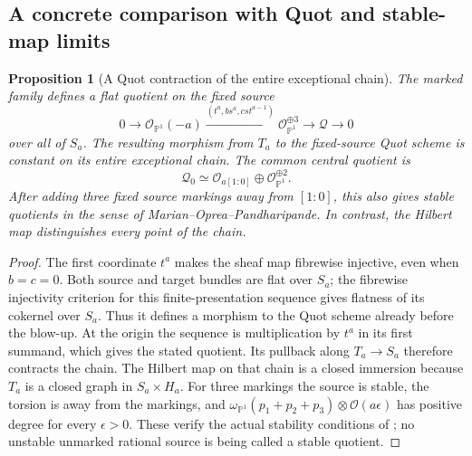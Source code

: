 \documentclass[11pt,reqno]{amsart}
\numberwithin{equation}{section}
\newtheorem{proposition}[theorem]{Proposition}
\theoremstyle{definition}\newtheorem{definition}[theorem]{Definition}
\theoremstyle{remark}\newtheorem{remark}[theorem]{Remark}
\newcommand{\Pj}{\mathbb P}\newcommand{\A}{\mathbb A}
\newcommand{\OO}{\mathcal O}\newcommand{\II}{\mathcal I}
\begin{document}
\subsection{A concrete comparison with Quot and stable-map limits}
\begin{proposition}[A Quot contraction of the entire exceptional chain]
\label{prop:quot-contraction-v169}
The marked family defines a flat quotient on the fixed source
\begin{equation}\label{eq:quot-sequence-v169}
 0\longrightarrow\OO_{\Pj^1}(-a)
   \xrightarrow{(t^a,bs^a,cst^{a-1})}\OO_{\Pj^1}^{\oplus3}
   \longrightarrow\mathcal Q\longrightarrow0
\end{equation}
over all of $S_a$. The resulting morphism from $T_a$ to the fixed-source
Quot scheme is constant on its entire exceptional chain. The common
central quotient is
\[
 \mathcal Q_0\simeq\OO_{a[1:0]}\oplus\OO_{\Pj^1}^{\oplus2}.
\]
After adding three fixed source markings away from $[1:0]$, this also
gives stable quotients in the sense of Marian--Oprea--Pandharipande.
In contrast, the Hilbert map distinguishes every point of the chain.
\end{proposition}
\begin{proof}
The first coordinate $t^a$ makes the sheaf map fibrewise injective,
even when $b=c=0$. Both source and target bundles are flat over $S_a$;
the fibrewise injectivity criterion for this finite-presentation
sequence gives flatness of its cokernel over $S_a$. Thus it defines
a morphism to the Quot scheme already before the blow-up. At the
origin the sequence is multiplication by $t^a$ in its first summand,
which gives the stated quotient. Its pullback along $T_a\to S_a$
therefore contracts the chain. The Hilbert map on that chain is a
closed immersion because $T_a$ is a closed graph in $S_a\times H_a$.
For three markings the source is stable, the torsion is away from
the markings, and $\omega_{\Pj^1}(p_1+p_2+p_3)\otimes\OO(a\epsilon)$
has positive degree for every $\epsilon>0$. These verify the actual
stability conditions of \cite[Section~2]{MOP169}; no unstable
unmarked rational source is being called a stable quotient.
\end{proof}
\end{document}
